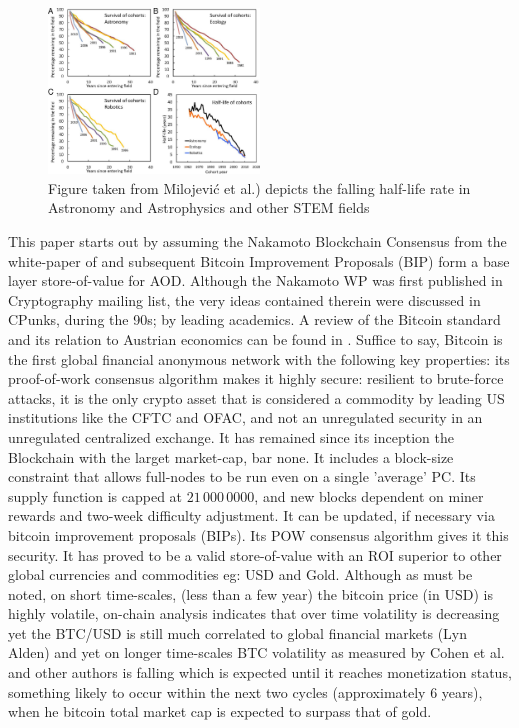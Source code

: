 \documentclass[final,5p,times,twocolumn,authoryear]{elsarticle}
\begin{document}
\begin{figure}[h!]
    \centering
  \caption{Figure taken from Milojević et al.) depicts the falling half-life rate in Astronomy and Astrophysics and other STEM fields}
  \label{fig:F4.large}
  \includegraphics[width=0.5\textwidth]{figs/F4.large.jpg}
\end{figure}
This paper starts out by assuming the Nakamoto Blockchain Consensus from the white-paper of \cite{nak2009} and subsequent Bitcoin Improvement Proposals (BIP) form a base layer store-of-value for AOD. Although the Nakamoto WP was first published in Cryptography mailing list, the very ideas contained therein were discussed in CPunks, during the 90s; by leading academics. A review of the Bitcoin standard and its relation to Austrian economics can be found in \citet{Hansen2020Book}. Suffice to say, Bitcoin is the first global financial anonymous network with the following key properties: its proof-of-work consensus algorithm makes it highly secure: resilient to brute-force attacks, it is the only crypto asset that is considered a commodity by leading US institutions like the CFTC and OFAC, and not an unregulated security in an unregulated centralized exchange. It has remained since its inception the Blockchain with the larget market-cap, bar none. It includes a block-size constraint that allows full-nodes to be run even on a single 'average' PC. Its supply function is capped at $21\,000\,0000$, and new blocks dependent on miner rewards and two-week difficulty adjustment. It can be updated, if necessary via bitcoin improvement proposals (BIPs). Its POW consensus algorithm gives it this security. It has proved to be a valid store-of-value with an ROI superior to other global currencies and commodities eg: USD and Gold. Although as must be noted, on short time-scales, (less than a few year) the bitcoin price (in USD) is highly volatile, on-chain analysis indicates that over time volatility is decreasing yet the BTC/USD is still much correlated to global financial markets (Lyn Alden) and yet on longer time-scales BTC volatility as measured by Cohen et al. and other authors is falling which is expected until it reaches monetization status, something likely to occur within the next two cycles (approximately 6 years), when he bitcoin total market cap is expected to surpass that of gold. 
\end{document}
